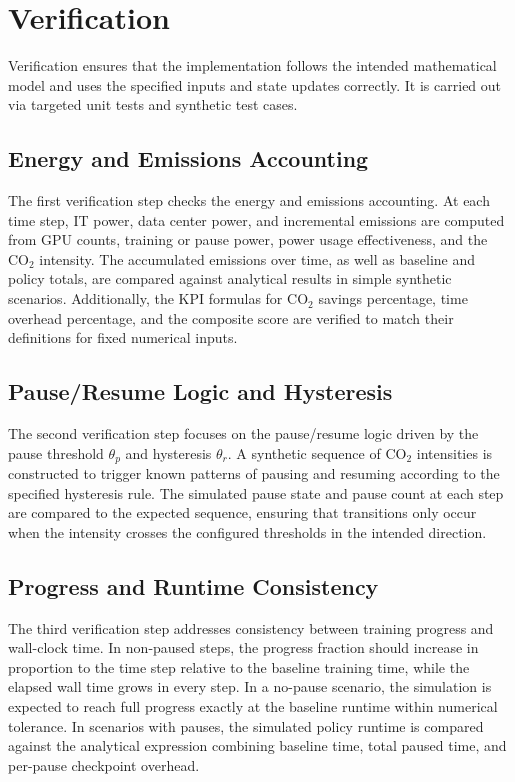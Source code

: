 \section{Verification}

Verification ensures that the implementation follows the intended mathematical
model and uses the specified inputs and state updates correctly.  It is
carried out via targeted unit tests and synthetic test cases.

\subsection{Energy and Emissions Accounting}

The first verification step checks the energy and emissions accounting.  At
each time step, IT power, data center power, and incremental emissions are
computed from GPU counts, training or pause power, power usage effectiveness, and the CO$_2$
intensity.  The accumulated emissions over time, as well as baseline and
policy totals, are compared against analytical results in simple synthetic
scenarios.  Additionally, the KPI formulas for CO$_2$ savings percentage, time
overhead percentage, and the composite score are verified to match their
definitions for fixed numerical inputs.

\subsection{Pause/Resume Logic and Hysteresis}

The second verification step focuses on the pause/resume logic driven by the
pause threshold $\theta_p$ and hysteresis $\theta_r$.  A synthetic sequence of
CO$_2$ intensities is constructed to trigger known patterns of pausing and
resuming according to the specified hysteresis rule.  The simulated pause
state and pause count at each step are compared to the expected sequence,
ensuring that transitions only occur when the intensity crosses the configured
thresholds in the intended direction.

\subsection{Progress and Runtime Consistency}

The third verification step addresses consistency between training progress
and wall-clock time.  In non-paused steps, the progress fraction should
increase in proportion to the time step relative to the baseline training
time, while the elapsed wall time grows in every step.  In a no-pause
scenario, the simulation is expected to reach full progress exactly at the
baseline runtime within numerical tolerance.  In scenarios with pauses, the
simulated policy runtime is compared against the analytical expression
combining baseline time, total paused time, and per-pause checkpoint overhead.

